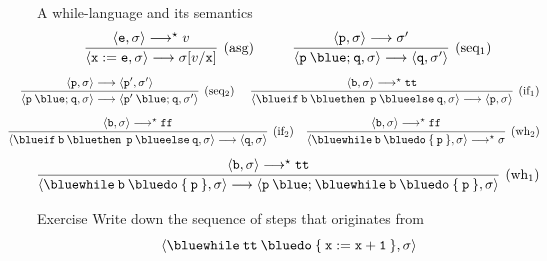 \documentclass{beamer}
\begin{document}
\begin{frame}{A while-language and its semantics}
        \[
                \infer[(\text{asg})]{
                        \langle \mathtt{x := e}, \sigma \rangle \longrightarrow
                        \sigma[v / \mathtt{x}]
                }{
                       \langle \mathtt{e}, \sigma \rangle \longrightarrow^\star v
                } \hspace{1cm}
                \infer[(\text{seq$_1$})]{
                        \langle \mathtt{p \> {\blue ;} \> q}, \sigma \rangle \longrightarrow 
                        \pv{\prog{q}}{\sigma'}
                }{
                        \langle \mathtt{p}, \sigma \rangle \longrightarrow \sigma'
                }
        \]
        \vspace{0.001cm}
        \[
                \hspace{-0.5cm}
                \infer[(\text{seq$_2$})]{
                        \langle \mathtt{p \> {\blue ;} \> q}, \sigma \rangle \longrightarrow 
                        \pv{\prog{p' \> {\blue ;} \> q}}{\sigma'}
                }{
                        \langle \mathtt{p}, \sigma \rangle 
                        \longrightarrow \pv{\prog{p'}}{\sigma'}
                }
                \hspace{0.5cm}
                \infer[(\text{if$_1$})]{
                        \langle \mathtt{{\blue if} \> b \> {\blue then} \> \> 
                        p \> {\blue else} \> q}, 
                        \sigma \rangle \longrightarrow \pv{\prog{p}}{\sigma}
                }{
                        \langle \mathtt{b}, \sigma \rangle \longrightarrow^\star \mathtt{tt} 
                } 
        \]
        \vspace{0.001cm}
        \[      \hspace{-0.9cm}
                \infer[(\text{if$_2$})]{
                        \langle \mathtt{{\blue if} \> b \> {\blue then} \> \> 
                        p \> {\blue else} \> q}, 
                        \sigma \rangle \longrightarrow \pv{\prog{q}}{\sigma}
                }{
                        \langle \mathtt{b}, \sigma \rangle \longrightarrow^\star \mathtt{ff} 
                } 
                \hspace{0.4cm}
                \infer[(\text{wh$_2$})]{
                        \langle 
                        \mathtt{{\blue while} \> b \> {\blue do} \> \{ \> p \> \}}, \sigma \rangle
                        \longrightarrow^\star \sigma
                }{
                        \langle \mathtt{b}, \sigma \rangle \longrightarrow^\star \mathtt{ff}
                }
        \]\vspace{0.001cm}
        \[
                \infer[(\text{wh$_1$})]{
                        \langle \mathtt{{\blue while} \> b \> {\blue do} \> \{ \> p \> \}}, 
                        \sigma \rangle
                        \longrightarrow 
                        \pv{\prog{p} \> {\blue ;} \> 
                        \mathtt{{\blue while} \> b \> {\blue do} \> \{ \> p \> \}}}{
                        \sigma}
                }{
                        \pv{\prog{b}}{\sigma} \longrightarrow^\star \prog{tt} 
                }
        \]
\end{frame}

\begin{frame}{Exercise}
        Write down the sequence of steps that originates from
        \[
           \pv{\mathtt{{\blue while} \> \prog{tt} \> {\blue do} \> \{ \> x := x +1 \> \}}}{\sigma}
        \]
\end{frame}
\end{document}
